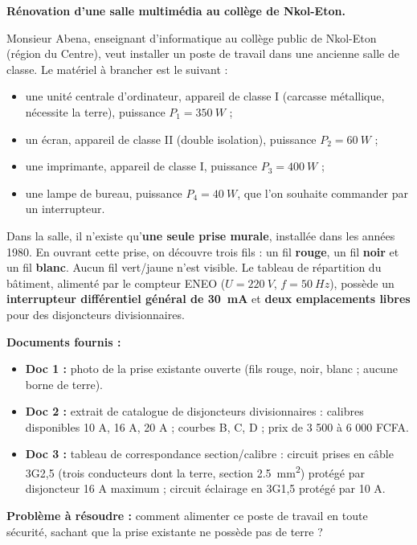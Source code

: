 \documentclass[11pt]{article}
\newcommand{\cle}[1]{{\popxbold\color{popdark}#1}}
\newcounter{popsec}
\newcounter{popsub}
\newcommand{\courssub}[1]{%
  \stepcounter{popsub}%
  \par\vspace{9pt}\noindent{\popxbold\fontsize{11.5}{13}\selectfont\color{popink}{\color{poporange}\thepopsec.\thepopsub}\hspace{6pt}#1}\par\nopagebreak\vspace{4pt}
}
\begin{document}
\courssub{Situation}

\textbf{Rénovation d'une salle multimédia au collège de Nkol-Eton.}

Monsieur Abena, enseignant d'informatique au collège public de Nkol-Eton (région du Centre), veut installer un poste de travail dans une ancienne salle de classe. Le matériel à brancher est le suivant :

\begin{itemize}
\item une unité centrale d'ordinateur, appareil de \cle{classe I} (carcasse métallique, nécessite la terre), puissance $P_1 = \SI{350}{W}$ ;
\item un écran, appareil de \cle{classe II} (double isolation), puissance $P_2 = \SI{60}{W}$ ;
\item une imprimante, appareil de \cle{classe I}, puissance $P_3 = \SI{400}{W}$ ;
\item une lampe de bureau, puissance $P_4 = \SI{40}{W}$, que l'on souhaite commander par un interrupteur.
\end{itemize}

Dans la salle, il n'existe qu'\textbf{une seule prise murale}, installée dans les années 1980. En ouvrant cette prise, on découvre trois fils : un fil \textbf{rouge}, un fil \textbf{noir} et un fil \textbf{blanc}. Aucun fil vert/jaune n'est visible. Le tableau de répartition du bâtiment, alimenté par le compteur ENEO ($U = \SI{220}{V}$, $f = \SI{50}{Hz}$), possède un \textbf{interrupteur différentiel général de \SI{30}{mA}} et \textbf{deux emplacements libres} pour des disjoncteurs divisionnaires.

\textbf{Documents fournis :}
\begin{itemize}
\item \textbf{Doc 1 :} photo de la prise existante ouverte (fils rouge, noir, blanc ; aucune borne de terre).
\item \textbf{Doc 2 :} extrait de catalogue de disjoncteurs divisionnaires : calibres disponibles 10 A, 16 A, 20 A ; courbes B, C, D ; prix de 3 500 à 6 000 FCFA.
\item \textbf{Doc 3 :} tableau de correspondance section/calibre : circuit prises en câble 3G2,5 (trois conducteurs dont la terre, section \SI{2,5}{mm^2}) protégé par disjoncteur 16 A maximum ; circuit éclairage en 3G1,5 protégé par 10 A.
\end{itemize}

\textbf{Problème à résoudre :} comment alimenter ce poste de travail en toute sécurité, sachant que la prise existante ne possède pas de terre ?
\end{document}
